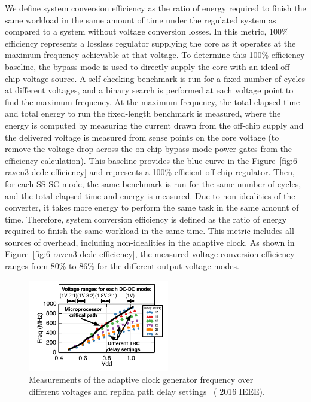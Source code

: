 \documentclass[graybox]{svmult}
\begin{document}
We define system conversion efficiency as the ratio of energy required to finish the same workload in the same amount of time under the regulated system as compared to a system without voltage conversion losses.
In this metric, 100\% efficiency represents a lossless regulator supplying the core as it operates at the maximum frequency achievable at that voltage.
To determine this 100\%-efficiency baseline, the bypass mode is used to directly supply the core with an ideal off-chip voltage source.
A self-checking benchmark is run for a fixed number of cycles at different voltages, and a binary search is performed at each voltage point to find the maximum frequency.
At the maximum frequency, the total elapsed time and total energy to run the fixed-length benchmark is measured, where the energy is computed by measuring the current drawn from the off-chip supply and the delivered voltage is measured from sense points on the core voltage (to remove the voltage drop across the on-chip bypass-mode power gates from the efficiency calculation).
This baseline provides the blue curve in the Figure~\ref{fig:6-raven3-dcdc-efficiency} and represents a 100\%-efficient off-chip regulator.
Then, for each SS-SC mode, the same benchmark is run for the same number of cycles, and the total elapsed time and energy is measured.
Due to non-idealities of the converter, it takes more energy to perform the same task in the same amount of time.
Therefore, system conversion efficiency is defined as the ratio of energy required to finish the same workload in the same time.
This metric includes all sources of overhead, including non-idealities in the adaptive clock.
As shown in Figure~\ref{fig:6-raven3-dcdc-efficiency}, the measured voltage conversion efficiency ranges from 80\% to 86\% for the different output voltage modes.

\begin{figure}
  \centering
  \includegraphics[width=0.55\textwidth]{6-raven3-clock}
  \caption{Measurements of the adaptive clock generator frequency over different voltages and replica path delay settings~\cite{Zimmer2016} ({\textcopyright} 2016 IEEE). }
  \label{fig:6-raven3-clock}
\end{figure}
\end{document}
